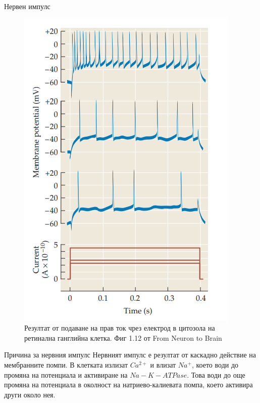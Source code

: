 \begin{frame}[t]{Нервен импулс}
  \begin{figure}[htbp!]
    \centering
    \includegraphics[width=\textwidth,height=0.7\textheight,keepaspectratio]{ac-current.PNG}
    \caption{Резултат от подаване на прав ток чрез електрод в цитозола на ретинална ганглийна клетка. Фиг 1.12 от From Neuron to Brain}
  \end{figure}
\end{frame}

\begin{frame}[t]{Причина за нервния импулс}
  Нервният импулс е резултат от каскадно действие на мембранните помпи. 
  В клетката излизат $Ca^{2+}$ и влизат $Na^{+}$, което води до промяна на потенциала и активиране на $Na-K-ATPase$.
  Това води до още промяна на потенциала в околност на натриево-калиевата помпа, което активира други около нея.
\end{frame}